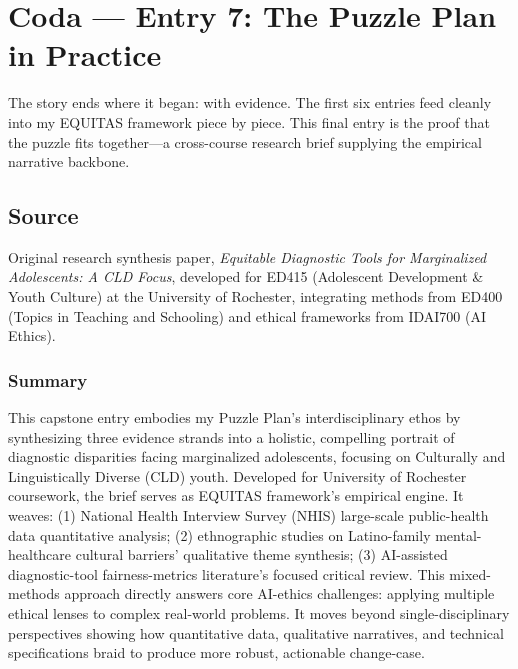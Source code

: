 \documentclass[11pt,twoside]{article}
\begin{document}
\newpage


\label{coda}
\section*{Coda --- Entry 7: The Puzzle Plan in Practice}

\vspace{-0.3cm}

The story ends where it began: with evidence. The first six entries feed cleanly into my \textsc{EQUITAS} framework piece by piece. This final entry is the proof that the puzzle fits together---a cross-course research brief supplying the empirical narrative backbone.

\vspace{-0.3cm}

\subsection*{Source}

\vspace{-0.3cm}

Original research synthesis paper, \textit{Equitable Diagnostic Tools for Marginalized Adolescents: A CLD Focus}, developed for ED415 (Adolescent Development \& Youth Culture) at the University of Rochester, integrating methods from ED400 (Topics in Teaching and Schooling) and ethical frameworks from IDAI700 (AI Ethics).

\vspace{-0.3cm}

\subsubsection*{Summary}

\vspace{-0.3cm}

This capstone entry embodies my Puzzle Plan's interdisciplinary ethos by synthesizing three evidence strands into a holistic, compelling portrait of diagnostic disparities facing marginalized adolescents, focusing on Culturally and Linguistically Diverse (CLD) youth. Developed for University of Rochester coursework, the brief serves as EQUITAS framework's empirical engine. It weaves: (1) National Health Interview Survey (NHIS) large-scale public-health data quantitative analysis; (2) ethnographic studies on Latino-family mental-healthcare cultural barriers' qualitative theme synthesis; (3) AI-assisted diagnostic-tool fairness-metrics literature's focused critical review. This mixed-methods approach directly answers core AI-ethics challenges: applying multiple ethical lenses to complex real-world problems. It moves beyond single-disciplinary perspectives showing how quantitative data, qualitative narratives, and technical specifications braid to produce more robust, actionable change-case.
\end{document}

